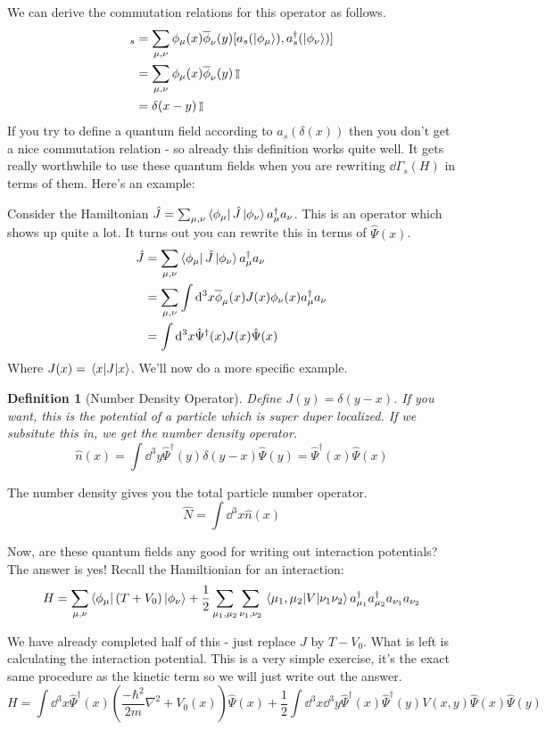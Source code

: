 \documentclass{article}
\DeclareMathOperator{\II}{\mathbb{I}}
\newtheorem{defn}{Definition}
\begin{document}
We can derive the commutation relations for this operator as follows.
\begin{align}
[\hat\Psi(x),\hat\Psi(y)]_s &= \sum_{\mu,\nu} \phi_\mu(x) \overline \phi_\nu(y)[a_s(\ket{\phi_\mu}),a_s^\dagger(\ket{\phi_\nu})]\\
&= \sum_{\mu,\nu} \phi_\mu(x)\overline\phi_\nu(y) \II\\
&= \delta(x-y)\II
\end{align}
If you try to define a quantum field according to $a_s(\delta(x))$ then you don't get a nice commutation relation - so already this definition works quite well. It gets really worthwhile to use these quantum fields when you are rewriting $\dd \Gamma_s(H)$ in terms of them. Here's an example:

Consider the Hamiltonian $\hat J = \sum_{\mu,\nu} \bra{\phi_\mu}\hat J\ket{\phi_\nu} a_\mu^\dagger a_\nu$. This is an operator which shows up quite a lot. It turns out you can rewrite this in terms of $\hat \Psi(x)$.
\begin{align}
\hat J &= \sum_{\mu,\nu} \bra{\phi_\mu}\hat J\ket{\phi_\nu} a_\mu^\dagger a_\nu\\
&= \sum_{\mu,\nu}\int \dd^3 x \overline \phi_\mu(x) J(x)\phi_\nu(x) a^\dagger_\mu a_\nu\\
&= \int \dd^3 x \hat \Psi^\dagger(x) J(x) \hat \Psi(x)
\end{align}
Where $J(x) = \expval{J}{x}$. We'll now do a more specific example.
\begin{defn}[Number Density Operator] Define $J(y) = \delta(y-x)$. If you want, this is the potential of a particle which is super duper localized. If we subsitute this in, we get the number density operator.
\begin{equation}
\hat{n}(x) = \int \dd^3 y \hat\Psi^\dagger (y)\delta(y-x) \hat \Psi(y) = \hat \Psi^\dagger(x) \hat\Psi(x)
\end{equation}
\end{defn}
The number density gives you the total particle number operator.
\[\hat N = \int \dd^3 x \hat n(x)\]

Now, are these quantum fields any good for writing out interaction potentials? The answer is yes! Recall the Hamiltionian for an interaction:
\[H = \sum_{\mu,\nu}\bra{\phi_\mu}(T+V_0)\ket{\phi_\nu} + \frac{1}{2}\sum_{\mu_1,\mu_2}\sum_{\nu_1,\nu_2}\mel{\mu_1,\mu_2}{V}{\nu_1\nu_2} a_{\mu_1}^\dagger a_{\mu_2}^\dagger a_{\nu_1} a_{\nu_2}\]

We have already completed half of this - just replace $J$ by $T-V_0$. What is left is calculating the interaction potential. This is a very simple exercise, it's the exact same procedure as the kinetic term so we will just write out the answer.
\begin{equation}
H = \int \dd^3 x \hat \Psi^\dagger(x) \left( \frac{-\hbar^2}{2m}\nabla^2 + V_0(x) \right) \hat \Psi(x) + \frac{1}{2}\int \dd^3 x \dd^3 y \hat \Psi^\dagger(x) \hat \Psi^\dagger(y) V(x,y) \hat\Psi(x) \hat\Psi(y)
\end{equation}
\end{document}
